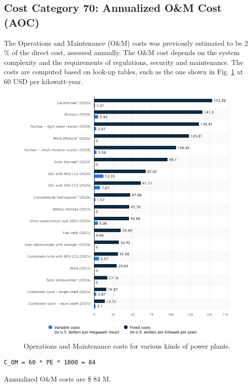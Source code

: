 \subsection{Cost Category 70: Annualized O\&M Cost (AOC)}

The Operations and Maintenance (O\&M) costs was previously estimated to be 2 \% of the direct cost, assessed annually.  The O\&M cost depends on the system complexity and the requirements of regulations, security and maintenance. The costs are computed based on look-up tables, such as the one shown in Fig. \ref{fig:statista} at 60 USD per kilowatt-year.  

\begin{figure}[b!] 
\centering 
\includegraphics[scale=0.5]{StandardFigures/statista.png} 
\caption{Operations and Maintenance costs for various kinds of power plants.} 
\label{fig:statista} 
\end{figure} 

\begin{verbatim} 
C_OM = 60 * PE * 1000 = 84  
\end{verbatim} 

Annualized O\&M costs are \$ 84 M.

